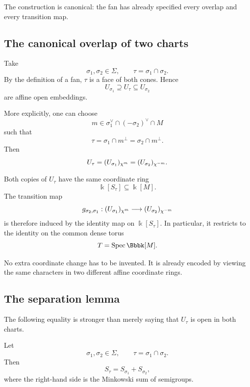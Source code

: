 The construction is canonical: the fan has already specified every
overlap and every transition map.

\subsection{The canonical overlap of two charts}

Take
\[
\sigma_1,\sigma_2\in\Sigma,
\qquad
\tau=\sigma_1\cap\sigma_2.
\]
By the definition of a fan, \(\tau\) is a face of both cones. Hence
\[
U_{\sigma_1}\supseteq U_\tau\subseteq U_{\sigma_2}
\]
are affine open embeddings.

More explicitly, one can choose
\[
m\in
\sigma_1^\vee\cap(-\sigma_2)^\vee\cap M
\]
such that
\[
\tau
=
\sigma_1\cap m^\perp
=
\sigma_2\cap m^\perp.
\]
Then
\[
U_\tau
=
(U_{\sigma_1})_{\chi^{m}}
=
(U_{\sigma_2})_{\chi^{-m}}.
\]

Both copies of \(U_\tau\) have the same coordinate ring
\[
\Bbbk[S_\tau]
\subseteq
\Bbbk[M].
\]
The transition map
\[
g_{\sigma_2,\sigma_1}:
(U_{\sigma_1})_{\chi^{m}}
\longrightarrow
(U_{\sigma_2})_{\chi^{-m}}
\]
is therefore induced by the identity map on
\(\Bbbk[S_\tau]\). In particular, it restricts to the identity on the
common dense torus
\[
T=\Spec\Bbbk[M].
\]

\begin{center}
\end{center}

No extra coordinate change has to be invented. It is already encoded
by viewing the same characters in two different affine coordinate
rings.

\subsection{The separation lemma}

The following equality is stronger than merely saying that
\(U_\tau\) is open in both charts.

\begin{proposition}
\label{prop:separation-lemma-fans}
Let
\[
\sigma_1,\sigma_2\in\Sigma,
\qquad
\tau=\sigma_1\cap\sigma_2.
\]
Then
\[
S_\tau
=
S_{\sigma_1}+S_{\sigma_2},
\]
where the right-hand side is the Minkowski sum of semigroups.
\end{proposition}


